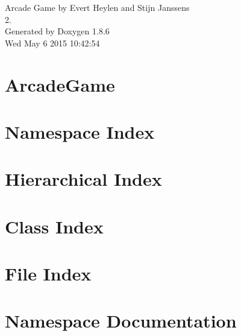 \documentclass[twoside]{book}
\newcommand{\clearemptydoublepage}{%
  \newpage{\pagestyle{empty}\cleardoublepage}%
}
\begin{document}
\hypersetup{pageanchor=false}
\begin{titlepage}
\vspace*{7cm}
\begin{center}%
{\Large Arcade Game by Evert Heylen and Stijn Janssens \\[1ex]\large 2. }\\
\vspace*{1cm}
{\large Generated by Doxygen 1.8.6}\\
\vspace*{0.5cm}
{\small Wed May 6 2015 10:42:54}\\
\end{center}
\end{titlepage}
\clearemptydoublepage
\tableofcontents
\clearemptydoublepage
{}
\hypersetup{pageanchor=true}

\chapter{Arcade\-Game}
\label{md__r_e_a_d_m_e}
\hypertarget{md__r_e_a_d_m_e}{}

\chapter{Namespace Index}

\chapter{Hierarchical Index}

\chapter{Class Index}

\chapter{File Index}

\chapter{Namespace Documentation}




\end{document}
